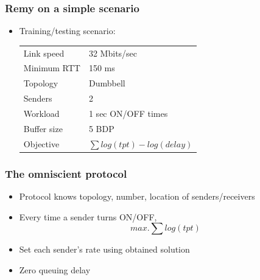 \begin{frame}
\frametitle{Remy on a simple scenario}
\begin{itemize}
\item Training/testing scenario:
\begin{tabular}{p{}p{}}
Link speed & 32 Mbits/sec \\
Minimum RTT & 150 ms \\
Topology & Dumbbell \\
Senders & 2 \\
Workload & 1 sec ON/OFF times \\
Buffer size & 5 BDP \\
Objective & $\sum log(tpt) - log(delay)$
\end{tabular}
\end{itemize}
\end{frame}

\begin{frame}
\frametitle{The omniscient protocol}
\begin{itemize}
\item Protocol knows topology, number, location of senders/receivers  
\item Every time a sender turns ON/OFF,
      \begin{equation*}
      max. \sum log (tpt)
      \end{equation*}
\item Set each sender's rate using obtained solution
\item Zero queuing delay
\end{itemize}
\end{frame}

